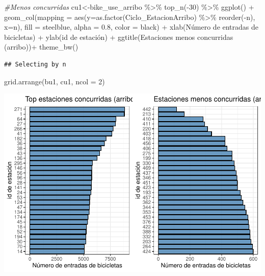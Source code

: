 \documentclass[
]{article}
\newenvironment{Shaded}{\begin{snugshade}}{\end{snugshade}}
\newcommand{\AttributeTok}[1]{\textcolor[rgb]{0.77,0.63,0.00}{#1}}
\newcommand{\CommentTok}[1]{\textcolor[rgb]{0.56,0.35,0.01}{\textit{#1}}}
\newcommand{\DecValTok}[1]{\textcolor[rgb]{0.00,0.00,0.81}{#1}}
\newcommand{\FloatTok}[1]{\textcolor[rgb]{0.00,0.00,0.81}{#1}}
\newcommand{\FunctionTok}[1]{\textcolor[rgb]{0.00,0.00,0.00}{#1}}
\newcommand{\NormalTok}[1]{#1}
\newcommand{\OtherTok}[1]{\textcolor[rgb]{0.56,0.35,0.01}{#1}}
\newcommand{\SpecialCharTok}[1]{\textcolor[rgb]{0.00,0.00,0.00}{#1}}
\newcommand{\StringTok}[1]{\textcolor[rgb]{0.31,0.60,0.02}{#1}}
\begin{document}
\begin{Shaded}
\begin{Highlighting}[]
\CommentTok{\#Menos concurridas}
\NormalTok{cu1}\OtherTok{\textless{}{-}}\NormalTok{bike\_use\_arribo }\SpecialCharTok{\%\textgreater{}\%} 
    \FunctionTok{top\_n}\NormalTok{(}\SpecialCharTok{{-}}\DecValTok{30}\NormalTok{) }\SpecialCharTok{\%\textgreater{}\%} 
    \FunctionTok{ggplot}\NormalTok{() }\SpecialCharTok{+}
    \FunctionTok{geom\_col}\NormalTok{(}\AttributeTok{mapping =} \FunctionTok{aes}\NormalTok{(}\AttributeTok{y=}\FunctionTok{as.factor}\NormalTok{(Ciclo\_EstacionArribo) }\SpecialCharTok{\%\textgreater{}\%} 
                               \FunctionTok{reorder}\NormalTok{(}\SpecialCharTok{{-}}\NormalTok{n),}
                           \AttributeTok{x=}\NormalTok{n),}
             \AttributeTok{fill =} \StringTok{\textquotesingle{}steelblue\textquotesingle{}}\NormalTok{,}
             \AttributeTok{alpha =} \FloatTok{0.8}\NormalTok{,}
             \AttributeTok{color =} \StringTok{\textquotesingle{}black\textquotesingle{}}\NormalTok{) }\SpecialCharTok{+}
    \FunctionTok{xlab}\NormalTok{(}\StringTok{\textquotesingle{}Número de entradas de bicicletas\textquotesingle{}}\NormalTok{) }\SpecialCharTok{+}
    \FunctionTok{ylab}\NormalTok{(}\StringTok{\textquotesingle{}id de estación\textquotesingle{}}\NormalTok{) }\SpecialCharTok{+}
    \FunctionTok{ggtitle}\NormalTok{(}\StringTok{\textquotesingle{}Estaciones menos concurridas (arribo)\textquotesingle{}}\NormalTok{)}\SpecialCharTok{+} \FunctionTok{theme\_bw}\NormalTok{()}
\end{Highlighting}
\end{Shaded}

\begin{verbatim}
## Selecting by n
\end{verbatim}

\begin{Shaded}
\begin{Highlighting}[]
\FunctionTok{grid.arrange}\NormalTok{(bu1, cu1, }\AttributeTok{ncol =} \DecValTok{2}\NormalTok{)}
\end{Highlighting}
\end{Shaded}

\includegraphics{Ecobici_files/figure-latex/unnamed-chunk-8-1.pdf}
\end{document}
